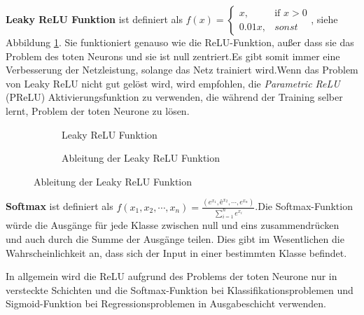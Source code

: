 \documentclass[12pt,a4paper]{scrartcl}
\numberwithin{equation}{section}
\begin{document}
\textbf{Leaky ReLU Funktion} ist definiert als $  f(x)= 
\begin{cases}
x,& \text{if } x  >  0\\
0.01x,              & sonst
\end{cases} $, siehe Abbildung \ref{fig:LReLU}. Sie funktioniert genauso wie die ReLU-Funktion, außer dass sie das Problem des toten Neurons und sie ist null zentriert.Es gibt somit immer eine Verbesserung der Netzleistung, solange das Netz trainiert wird.Wenn das Problem von Leaky ReLU nicht gut gelöst wird, wird empfohlen, die \textit{Parametric ReLU }(PReLU) Aktivierungsfunktion zu verwenden, die während der Training selber lernt, Problem der toten Neurone zu lösen.
\begin{figure}[h]
	\caption{Leaky ReLU Funktion}
	\begin{subfigure}{.5\textwidth}
		\centering
		\caption{Leaky ReLU Funktion}
	\end{subfigure}%
	\begin{subfigure}{.5\textwidth}
		\centering
		\caption{Ableitung der Leaky ReLU Funktion}
	\end{subfigure}
	
	\label{fig:LReLU}
	
\end{figure}




\textbf{Softmax} ist definiert als $ f(x_1, x_2, \cdots, x_n) = \frac{(e^{x_1}, ê^{x_2}, \cdots, e^{x_n})}{\sum_{i =1}^{n}{e^{x_i}}} $.Die Softmax-Funktion würde die Ausgänge für jede Klasse zwischen null und eins zusammendrücken und auch durch die Summe der Ausgänge teilen. Dies gibt im Wesentlichen die Wahrscheinlichkeit an, dass sich der Input in einer bestimmten Klasse befindet. 

In allgemein wird die ReLU aufgrund des Problems der toten Neurone nur in versteckte Schichten und die Softmax-Funktion bei Klassifikationsproblemen und Sigmoid-Funktion bei Regressionsproblemen in Ausgabeschicht verwenden.
\end{document}
